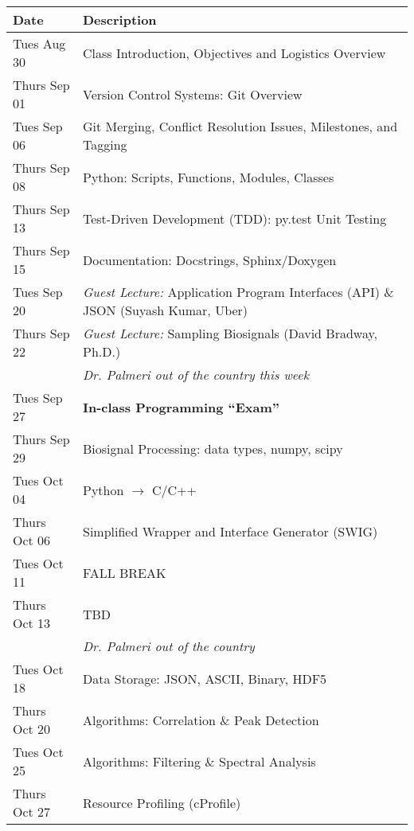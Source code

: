 \begin{longtable}[c]{|l|l|}

    \hline 
    
    \textbf{Date} & \textbf{Description} \\

    \hline

    Tues Aug 30     & Class Introduction, Objectives and Logistics Overview \\
    Thurs Sep 01    & Version Control Systems: Git Overview \\
    \hline
    Tues Sep 06     & Git Merging, Conflict Resolution Issues, Milestones, and Tagging \\
    Thurs Sep 08    & Python: Scripts, Functions, Modules, Classes \\
    \hline
    Thurs Sep 13    & Test-Driven Development (TDD): py.test Unit Testing \\
    Thurs Sep 15    & Documentation: Docstrings, Sphinx/Doxygen \\
    \hline
    Tues Sep 20     & \emph{Guest Lecture:} Application Program Interfaces (API) \& JSON (Suyash Kumar, Uber)\\
    Thurs Sep 22    & \emph{Guest Lecture:} Sampling Biosignals (David Bradway, Ph.D.)\\
                    & \emph{Dr. Palmeri out of the country this week}\\
    \hline
    Tues Sep 27     & \textbf{In-class Programming ``Exam''}\\
    Thurs Sep 29     & Biosignal Processing: data types, numpy, scipy\\
    \hline
    Tues Oct 04    & Python $\rightarrow$ C/C++\\
    Thurs Oct 06     & Simplified Wrapper and Interface Generator (SWIG)\\
    \hline
    Tues Oct 11     & FALL BREAK \\
    Thurs Oct 13    & TBD \\
                    & \emph{Dr. Palmeri out of the country}\\
    \hline
    Tues Oct 18     & Data Storage: JSON, ASCII, Binary, HDF5\\
    Thurs Oct 20    & Algorithms: Correlation \& Peak Detection \\
    \hline
    Tues Oct 25     & Algorithms: Filtering \& Spectral Analysis \\
    Thurs Oct 27    & Resource Profiling (cProfile)\\
    \hline

\end{longtable}

